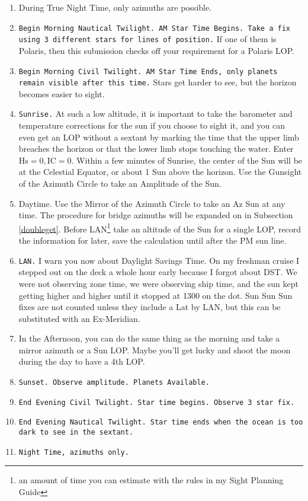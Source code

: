 \documentclass[letterpaper,12pt]{article}
\begin{document}
\begin{enumerate}
\item During True Night Time, only azimuths are possible.
    \item \texttt{Begin Morning Nautical Twilight. AM Star Time Begins. Take a fix using 3 different stars for lines of position.} If one of them is Polaris, then this submission checks off your requirement for a Polaris LOP.
    \item \texttt{Begin Morning Civil Twilight. AM Star Time Ends, only planets remain visible after this time.} Stars get harder to see, but the horizon becomes easier to sight.
    \item \texttt{Sunrise.} At such a low altitude, it is important to take the barometer and temperature corrections for the sun if you choose to sight it, and you can even get an LOP without a sextant by marking the time that the upper limb breaches the horizon or that the lower limb stops touching the water. Enter \(\text{Hs}=0, \text{IC}=0\). Within a few minutes of Sunrise, the center of the Sun will be at the Celestial Equator, or about 1 Sun above the horizon. Use the Gunsight of the Azimuth Circle to take an Amplitude of the Sun.
    \item Daytime. Use the Mirror of the Azimuth Circle to take an Az Sun at any time. The procedure for bridge azimuths will be expanded on in Subsection \ref{doubleget}. Before LAN\footnote{an amount of time you can estimate with the rules in my Sight Planning Guide} take an altitude of the Sun for a single LOP, record the information for later, save the calculation until after the PM sun line.
    \item \texttt{LAN.} I warn you now about Daylight Savings Time. On my freshman cruise I stepped out on the deck a whole hour early because I forgot about DST. We were not observing zone time, we were observing ship time, and the sun kept getting higher and higher until it stopped at 1300 on the dot. Sun Sun Sun fixes are not counted unless they include a Lat by LAN, but this can be substituted with an Ex-Meridian.
    \item In the Afternoon, you can do the same thing as the morning and take a mirror azimuth or a Sun LOP. Maybe you'll get lucky and shoot the moon during the day to have a 4th LOP.
    \item \texttt{Sunset. Observe amplitude. Planets Available.}
    \item \texttt{End Evening Civil Twilight. Star time begins. Observe 3 star fix.}
    \item \texttt{End Evening Nautical Twilight. Star time ends when the ocean is too dark to see in the sextant.} 
    \item \texttt{Night Time, azimuths only.}
\end{enumerate}
\end{document}
